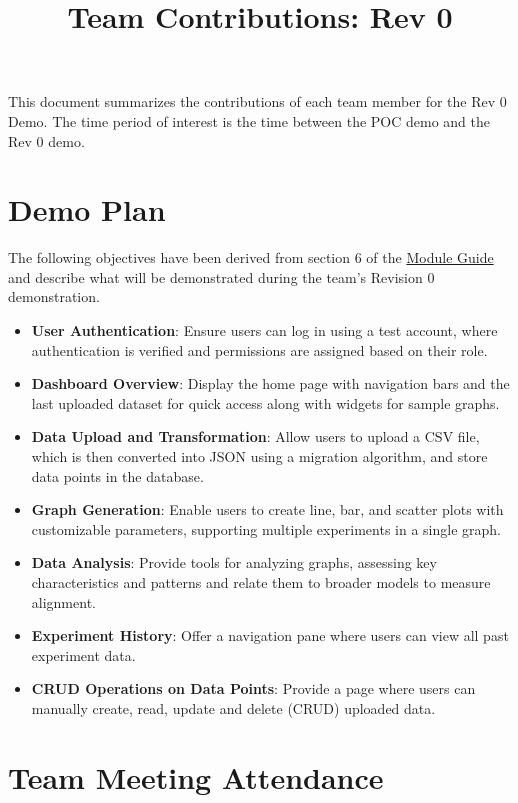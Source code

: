 \documentclass{article}
\title{Team Contributions: Rev 0\\\progname}
\author{\authname}
\date{}
\begin{document}
\maketitle

This document summarizes the contributions of each team member for the Rev 0
Demo.  The time period of interest is the time between the POC demo and the Rev
0 demo.

\section{Demo Plan}
The following objectives have been derived from section 6 of the \href{https://github.com/SumanyaG/Alkalytics/blob/main/docs/Design/MG.pdf}{Module Guide} 
and describe what will be demonstrated during the team’s Revision 0 demonstration.

\begin{itemize}
    \item \textbf{User Authentication}: Ensure users can log in using a test account,
    where authentication is verified and permissions are assigned based on their role.
    \item \textbf{Dashboard Overview}: Display the home page with navigation bars and
    the last uploaded dataset for quick access along with widgets for sample graphs.
    \item \textbf{Data Upload and Transformation}: Allow users to upload a CSV file,
    which is then converted into JSON using a migration algorithm, and store data
    points in the database.
    \item \textbf{Graph Generation}: Enable users to create line, bar, and scatter
    plots with customizable parameters, supporting multiple experiments in a single graph.
    \item \textbf{Data Analysis}: Provide tools for analyzing graphs, assessing key characteristics 
    and patterns and relate them to broader models to measure alignment.
    \item \textbf{Experiment History}: Offer a navigation pane where users can view
    all past experiment data.
    \item \textbf{CRUD Operations on Data Points}: Provide a page where users can
    manually create, read, update and delete (CRUD) uploaded data.
\end{itemize}

\section{Team Meeting Attendance}
\end{document}
